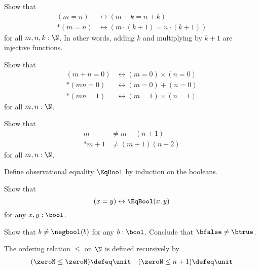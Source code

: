 \begin{exercises}
  \exitem
  \begin{subexenum}
  \item Show that
    \begin{align*}
      (m=n) & \leftrightarrow (m+k=n+k) \\*
      (m=n) & \leftrightarrow (m\cdot(k+1)=n\cdot(k+1))
    \end{align*}
    for all $m,n,k:\N$. In other words, adding $k$ and multiplying by $k+1$ are injective functions.
  \item \label{ex:is-zero-summand-is-zero-sum-N}Show that
    \begin{align*}
      (m+n=0) & \leftrightarrow (m=0)\times (n=0)\\*
      (mn=0) & \leftrightarrow (m=0)+(n=0)\\*
      (mn=1) & \leftrightarrow (m=1)\times (n=1)
    \end{align*}
    for all $m,n:\N$.
  \item Show that
    \begin{align*}
      m & \neq m+(n+1) \\*
      m+1 & \neq (m+1)(n+2)
    \end{align*}
    for all $m,n:\N$.
  \end{subexenum}
  \exitem \label{ex:obs_bool}
  \begin{subexenum}
  \item Define observational equality $\EqBool$ by induction on the booleans.
  \item Show that
    \begin{equation*}
      (x=y)\leftrightarrow \EqBool(x,y)
    \end{equation*}
    for any $x,y:\bool$.
  \item \label{ex:zero-neq-one-bool}Show that $b\neq\negbool(b)$ for any $b:\bool$. Conclude that $\bfalse\neq\btrue$. 
  \end{subexenum}
  \exitem \label{ex:order_N}The ordering relation $\leq$ on $\N$ is defined recursively by
    \begin{align*}
      (\zeroN\leq\zeroN) & \defeq \unit & (\zeroN\leq n+1) & \defeq \unit \\

\end{align*}
\end{exercises}
